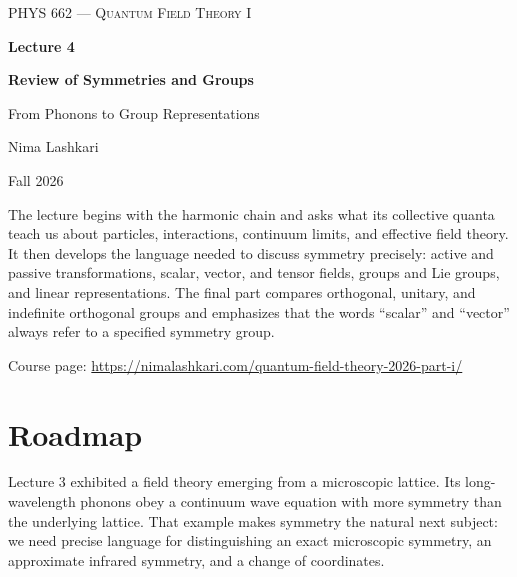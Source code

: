 \documentclass[11pt]{article}
\begin{document}

\begin{titlepage}
\centering
\vspace*{1.2in}
{\scshape\Large PHYS 662 --- Quantum Field Theory I\par}
\vspace{0.35in}
{\Huge\bfseries\color{qftblue} Lecture 4\par}
\vspace{0.15in}
{\LARGE\bfseries Review of Symmetries and Groups\par}
\vspace{0.12in}
{\Large\color{qftgreen} From Phonons to Group Representations\par}
\vspace{0.6in}
{\large Nima Lashkari\par}
{\large Fall 2026\par}
\vfill
\begin{minipage}{0.86\textwidth}
\small
The lecture begins with the harmonic chain and asks what its collective
quanta teach us about particles, interactions, continuum limits, and
effective field theory.  It then develops the language needed to discuss
symmetry precisely: active and passive transformations, scalar, vector, and
tensor fields, groups and Lie groups, and linear representations.  The final
part compares orthogonal, unitary, and indefinite orthogonal groups and
emphasizes that the words ``scalar'' and ``vector'' always refer to a
specified symmetry group.

\medskip
Course page: \url{https://nimalashkari.com/quantum-field-theory-2026-part-i/}
\end{minipage}
\vspace{0.5in}
\end{titlepage}

\tableofcontents
\newpage
{}

\section*{Roadmap}

Lecture 3 exhibited a field theory emerging from a microscopic lattice.  Its
long-wavelength phonons obey a continuum wave equation with more symmetry than
the underlying lattice.  That example makes symmetry the natural next
subject: we need precise language for distinguishing an exact microscopic
symmetry, an approximate infrared symmetry, and a change of coordinates.
\end{document}
